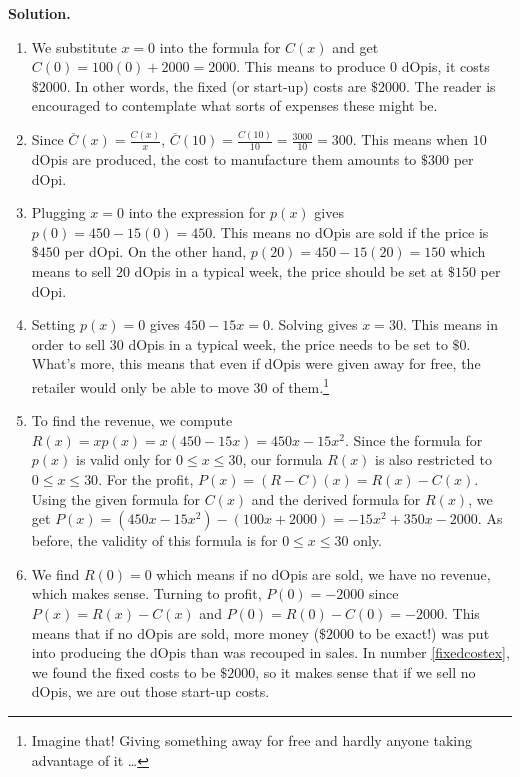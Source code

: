 \begin{ex}
\vspace{-.2in}

\pagebreak

{\bf Solution.}

\begin{enumerate}

\item \label{fixedcostex} We substitute $x=0$ into the formula for $C(x)$ and get $C(0) = 100(0) + 2000 = 2000$.  This means to produce $0$ dOpis, it costs $\$2000$.  In other words, the fixed (or start-up) costs are $\$2000$. The reader is encouraged to contemplate what sorts of expenses these might be.

\item  Since $\overline{C}(x) = \frac{C(x)}{x}$, $\overline{C}(10) = \frac{C(10)}{10} = \frac{3000}{10} = 300$.  This means when $10$ dOpis are produced, the cost to manufacture them amounts to $\$ 300$ per dOpi.

\item Plugging $x=0$ into the expression for $p(x)$ gives $p(0) = 450 - 15(0) = 450$.  This means no dOpis are sold if the price is  $\$450$ per dOpi.  On the other hand, $p(20) = 450-15(20) = 150$ which means to sell $20$ dOpis in a typical week, the price should be set at $\$150$ per dOpi.

\item  Setting $p(x) = 0$ gives $450-15x = 0$.  Solving gives $x = 30$.  This means in order to sell $30$ dOpis in a typical week, the price needs to be set to $\$ 0$. What's more, this means that even if dOpis were given away for free, the retailer would only be able to move $30$ of them.\footnote{Imagine that!  Giving something away for free and hardly anyone taking advantage of it \ldots}

\item  To find the revenue, we compute $R(x) = x p(x) = x (450 - 15x) = 450x - 15x^2$.  Since the formula for $p(x)$ is valid only for $0 \leq x \leq 30$, our formula $R(x)$ is also restricted to $0 \leq x \leq 30$.  For the profit, $P(x) = (R-C)(x) = R(x) - C(x)$.  Using the given formula for $C(x)$ and the derived formula for $R(x)$, we get $P(x) = \left(450x - 15x^2\right) -(100x+2000) = -15x^2+350x-2000$. As before, the validity of this formula is for $0 \leq x \leq 30$ only.

\item  We find $R(0) = 0$ which means if no dOpis are sold, we have no revenue, which makes sense.  Turning to profit, $P(0) = -2000$ since $P(x) = R(x) - C(x)$ and $P(0) = R(0) - C(0) = -2000$.  This means that if no dOpis are sold, more money ($\$2000$ to be exact!) was put into producing the dOpis than was recouped in sales. In number \ref{fixedcostex}, we found the fixed costs to be $\$2000$, so it makes sense that if we sell no dOpis, we are out those start-up costs. 


\end{enumerate}
\end{ex}
